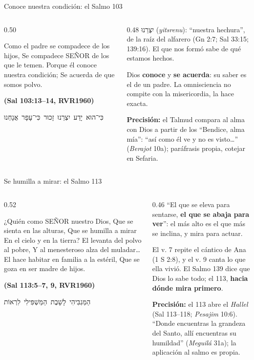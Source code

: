 \documentclass[hyperref={bookmarks=false},aspectratio=169]{beamer}
\newcommand{\heb}[1]{\mbox{\foreignlanguage{hebrew}{#1}}}
\newcommand{\SENOR}{S{\fontsize{0.78em}{1em}\selectfont EÑOR}}
\newcommand{\fuente}[1]{\par\hfill{\upshape\bfseries\footnotesize\textcolor{azul}{#1}}}
\newcommand{\destacar}[1]{\textbf{\textcolor{azul}{#1}}}
\newcommand{\precision}[1]{{\footnotesize\color{gris}\textbf{Precisión:} #1}}
\begin{document}
\begin{frame}{Conoce nuestra condición: el Salmo 103}
\begin{columns}[t,onlytextwidth]
\begin{column}{0.50\textwidth}
\begin{cita}Como el padre se compadece de los hijos, Se compadece \SENOR{} de los que le temen. Porque él conoce nuestra condición; Se acuerda de que somos polvo.\fuente{(Sal 103:13--14, RVR1960)}\end{cita}
\begin{center}\heb{כִּי־הוּא יָדַע יִצְרֵנוּ זָכוּר כִּי־עָפָר אֲנָחְנוּ}\end{center}
\end{column}
\begin{column}{0.48\textwidth}\small
\heb{יִצְרֵנוּ} (\emph{yitsrenu}): ``nuestra hechura'', de la raíz del alfarero (Gn 2:7; Sal 33:15; 139:16). El que nos formó sabe de qué estamos hechos.\par\medskip
Dios \destacar{conoce} y \destacar{se acuerda}: su saber es el de un padre. La omnisciencia no compite con la misericordia, la hace exacta.\par\medskip
\precision{el Talmud compara al alma con Dios a partir de los ``Bendice, alma mía'': ``así como él ve y no es visto\ldots'' (\emph{Berajot} 10a); paráfrasis propia, cotejar en Sefaria.}
\end{column}
\end{columns}
\end{frame}

\begin{frame}{Se humilla a mirar: el Salmo 113}
\begin{columns}[t,onlytextwidth]
\begin{column}{0.52\textwidth}
\begin{cita}¿Quién como \SENOR{} nuestro Dios, Que se sienta en las alturas, Que se humilla a mirar En el cielo y en la tierra? El levanta del polvo al pobre, Y al menesteroso alza del muladar\ldots{} El hace habitar en familia a la estéril, Que se goza en ser madre de hijos.\fuente{(Sal 113:5--7, 9, RVR1960)}\end{cita}
\begin{center}\heb{הַמַּגְבִּיהִי לָשָׁבֶת הַמַּשְׁפִּילִי לִרְאוֹת}\end{center}
\end{column}
\begin{column}{0.46\textwidth}\small
``El que se eleva para sentarse, \destacar{el que se abaja para ver}'': el más alto es el que más se inclina, y mira para actuar.\par\medskip
El v. 7 repite el cántico de Ana (1 S 2:8), y el v. 9 canta lo que ella vivió. El Salmo 139 dice que Dios lo sabe todo; el 113, \destacar{hacia dónde mira primero}.\par\medskip
\precision{el 113 abre el \emph{Hallel} (Sal 113--118; \emph{Pesajim} 10:6). ``Donde encuentras la grandeza del Santo, allí encuentras su humildad'' (\emph{Meguilá} 31a); la aplicación al salmo es propia.}
\end{column}
\end{columns}
\end{frame}
\end{document}
